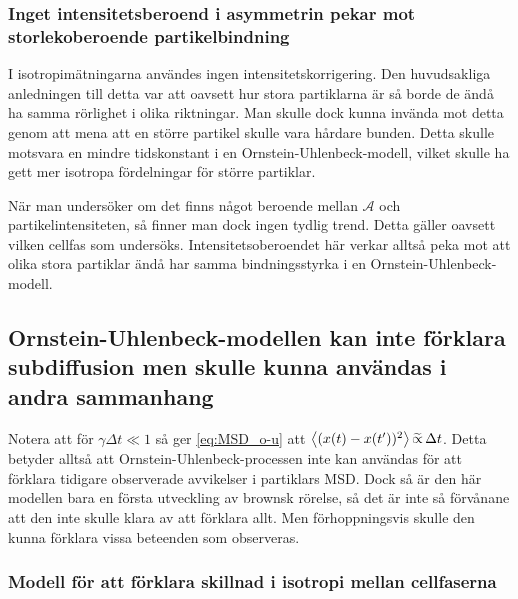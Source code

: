 \subsubsection{Inget intensitetsberoend i asymmetrin pekar mot storlekoberoende partikelbindning}
I isotropimätningarna användes ingen intensitetskorrigering. Den huvudsakliga anledningen till detta var att oavsett hur stora partiklarna är så borde de ändå ha samma rörlighet i olika riktningar. Man skulle dock kunna invända mot detta genom att mena att en större partikel skulle vara hårdare bunden. Detta skulle motsvara en mindre tidskonstant i en Ornstein-Uhlenbeck-modell, vilket skulle ha gett mer isotropa fördelningar för större partiklar.

När man undersöker om det finns något beroende mellan $\mathcal{A}$ och partikelintensiteten, så finner man dock ingen tydlig trend. Detta gäller oavsett vilken cellfas som undersöks.
Intensitetsoberoendet här verkar alltså peka mot att olika stora partiklar ändå har samma bindningsstyrka i en Ornstein-Uhlenbeck-modell. 







\subsection{Ornstein-Uhlenbeck-modellen kan inte förklara subdiffusion men skulle kunna användas i andra sammanhang}

Notera att för $\gamma\Delta{t}\ll 1$ så ger \eqref{eq:MSD_o-u} att 
$\ev{(x(t)-x(t') )^2}\widetilde{\propto}\,\Delta{t}$. Detta betyder alltså att Ornstein-Uhlenbeck-processen inte kan användas för att förklara tidigare observerade avvikelser\cite{Hofling&Franosch2013} i partiklars MSD. Dock så är den här modellen bara en första utveckling av brownsk rörelse, så det är inte så förvånane att den inte skulle klara av att förklara allt. Men förhoppningsvis skulle den kunna förklara vissa beteenden som observeras. 


\subsubsection{Modell för att förklara skillnad i isotropi mellan cellfaserna}




